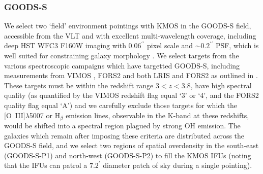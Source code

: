 \documentclass[fleqn,usenatbib]{mn2e}
\begin{document}
\subsubsection{GOODS-S}\label{subsubsec:sample_selection_goods}
We select two `field' environment pointings with KMOS in the GOODS-S field, accessible from the VLT and with excellent multi-wavelength coverage, including deep HST WFC3 F160W imaging with $ 0.06^{\prime\prime}$ pixel scale and $ \sim 0.2^{\prime\prime}$ PSF, which is well suited for constraining galaxy morphology \citep{Grogin2011,Koekemoer2011}.
We select targets from the various spectroscopic campaigns which have targetted GOODS-S, including measurements from VIMOS \citep{Balestra2010,Cassata2014}, FORS2 \citep{Vanzella2005,Vanzella2006,Vanzella2008} and both LRIS and FORS2 as outlined in \cite{Wuyts2009}.
These targets must be within the redshift range $3 < z < 3.8$, have high spectral quality (as quantified by the VIMOS redshift flag equal `3' or `4', and the FORS2 quality flag equal `A') and we carefully exclude those targets for which the [O~{\sc III}]$\lambda$5007 or H$_{\beta}$ emission lines, observable in the K-band at these redshifts, would be shifted into a spectral region plagued by strong OH emission.
The galaxies which remain after imposing these criteria are distributed across the GOODS-S field, and we select two regions of spatial overdensity in the south-east (GOODS-S-P1) and north-west (GOODS-S-P2) to fill the KMOS IFUs (noting that the IFUs can patrol a $7.2^{\prime}$ diameter patch of sky during a single pointing).
\end{document}
